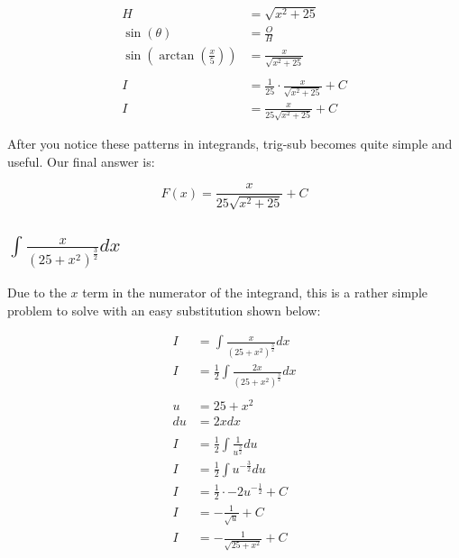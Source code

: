\documentclass[12pt]{article}
\begin{document}
\begin{align}
    H                                                & = \sqrt{x^2+25}                                                                          \\
    \sin(\theta)                                     & = \frac{O}{H}                                                                            \\
    \sin\left(\arctan\left(\frac{x}{5}\right)\right) & = \frac{x}{\sqrt{x^2+25}}                                                                \\
    \nonumber                                                                                                                                   \\
    I                                                & = \frac{1}{25} \cdot \frac{x}{\sqrt{x^2+25}} + C                                         \\
    I                                                & = \frac{x}{25\sqrt{x^2+25}} + C
\end{align}


After you notice these patterns in integrands, trig-sub becomes quite simple and useful.
Our final answer is:

$$
    F(x) = \frac{x}{25\sqrt{x^2+25}} + C
$$

\subsection{$\int \frac{x}{(25+x^2)^{\frac{3}{2}}} dx$}

Due to the $x$ term in the numerator of the integrand, this is a rather simple problem to solve with an easy substitution shown below:


\begin{align}
    I  & = \int \frac{x}{(25+x^2)^{\frac{3}{2}}} dx              \\
    I  & = \frac{1}{2} \int \frac{2x}{(25+x^2)^{\frac{3}{2}}} dx \\
    \nonumber                                                    \\
    u  & = 25 + x^2                                              \\
    du & = 2x dx                                                 \\
    \nonumber                                                    \\
    I  & = \frac{1}{2} \int \frac{1}{u^{\frac{3}{2}}} du         \\
    I  & = \frac{1}{2} \int u^{-\frac{3}{2}} du                  \\
    I  & = \frac{1}{2} \cdot -2u^{-\frac{1}{2}} + C              \\
    I  & = -\frac{1}{\sqrt{u}} + C                               \\
    I  & = -\frac{1}{\sqrt{25+x^2}} + C
\end{align}
\end{document}
